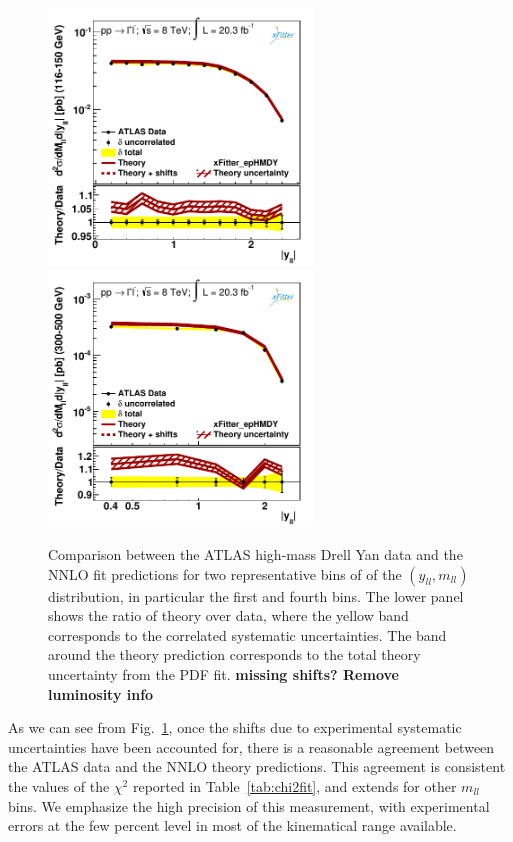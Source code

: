 \begin{figure}[h]
\centering
\includegraphics[width=7cm]{figs/data_1.pdf}
\includegraphics[width=7cm]{figs/data_404-1.pdf} 
\caption{Comparison between the ATLAS high-mass Drell Yan data and the NNLO fit predictions
  for two representative bins of of the $(y_{ll},m_{ll})$ distribution,
  in particular the first and fourth bins.
  The lower panel shows the ratio of theory over data, where the yellow band
  corresponds to the correlated systematic uncertainties.
  The band around the theory prediction corresponds to the total
  theory uncertainty from the PDF fit. {\bf missing shifts? Remove
  luminosity info}
}
\label{hmDY_2D}
\end{figure}

As we can see from Fig.~\ref{hmDY_2D}, once the shifts due to experimental systematic
uncertainties have been accounted for, there is a reasonable agreement
between the ATLAS data and the NNLO theory predictions.
%
This agreement is consistent the values of the $\chi^2$ reported in
Table~\ref{tab:chi2fit}, and extends for other $m_{ll}$ bins.
%
We emphasize the high precision of this measurement, with experimental
errors at the few percent level in most of the kinematical range available.

